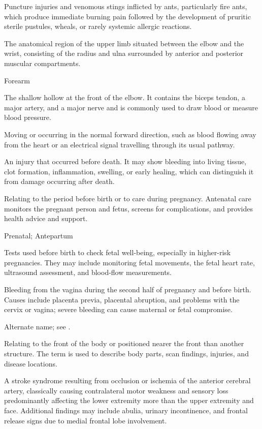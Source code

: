  Puncture injuries and venomous stings inflicted by ants, particularly fire ants, which produce immediate burning pain followed by the development of pruritic sterile pustules, wheals, or rarely systemic allergic reactions.

 The anatomical region of the upper limb situated between the elbow and the wrist, consisting of the radius and ulna surrounded by anterior and posterior muscular compartments.

\synonyms
Forearm

 The shallow hollow at the front of the elbow. It contains the biceps tendon, a major artery, and a major nerve and is commonly used to draw blood or measure blood pressure.

 Moving or occurring in the normal forward direction, such as blood flowing away from the heart or an electrical signal travelling through its usual pathway.

 An injury that occurred before death. It may show bleeding into living tissue, clot formation, inflammation, swelling, or early healing, which can distinguish it from damage occurring after death.

 Relating to the period before birth or to care during pregnancy. Antenatal care monitors the pregnant person and fetus, screens for complications, and provides health advice and support.

\synonyms
Prenatal; Antepartum

 Tests used before birth to check fetal well-being, especially in higher-risk pregnancies. They may include monitoring fetal movements, the fetal heart rate, ultrasound assessment, and blood-flow measurements.

 Bleeding from the vagina during the second half of pregnancy and before birth. Causes include placenta previa, placental abruption, and problems with the cervix or vagina; severe bleeding can cause maternal or fetal compromise.

 Alternate name; see .

 Relating to the front of the body or positioned nearer the front than another structure. The term is used to describe body parts, scan findings, injuries, and disease locations.

 A stroke syndrome resulting from occlusion or ischemia of the anterior cerebral artery, classically causing contralateral motor weakness and sensory loss predominantly affecting the lower extremity more than the upper extremity and face. Additional findings may include abulia, urinary incontinence, and frontal release signs due to medial frontal lobe involvement.


